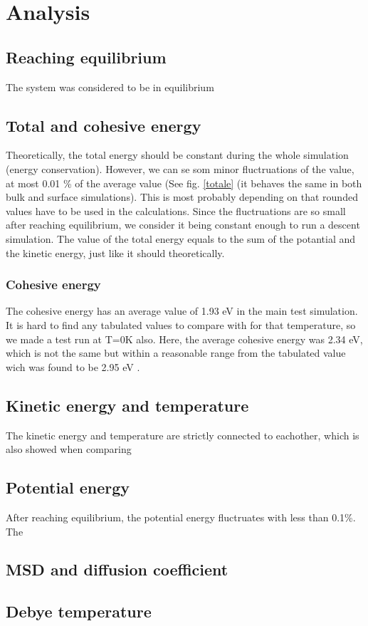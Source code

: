 \section{Analysis}

\subsection{Reaching equilibrium}
The system was considered to be in equilibrium

\subsection{Total and cohesive energy}
Theoretically, the total energy should be constant during the whole simulation (energy conservation). However, we can se som minor fluctruations of the value, at most 0.01 \% of the average value (See fig. \ref{totale} (it behaves the same in both bulk and surface simulations). This is most probably depending on that rounded values have to be used in the calculations. Since the fluctruations are so small after reaching equilibrium, we consider it being constant enough to run a descent simulation. 
The value of the total energy equals to the sum of the potantial and the kinetic energy, just like it should theoretically.
\subsubsection{Cohesive energy}
The cohesive energy has an average value of 1.93 eV in the main test simulation. It is hard to find any tabulated values to compare with for that temperature, so we made a test run at T=0K also. Here, the average cohesive energy was 2.34 eV, which is not the same but within a reasonable range from the tabulated value wich was found to be 2.95 eV \cite{kittel}.

\subsection{Kinetic energy and temperature}
The kinetic energy and temperature are strictly connected to eachother, which is also showed when comparing 

\subsection{Potential energy}
After reaching equilibrium, the potential energy fluctruates with less than 0.1\%. The 

\subsection{MSD and diffusion coefficient}

\subsection{Debye temperature}


